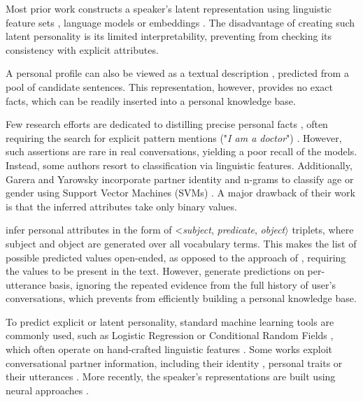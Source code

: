 Most prior work constructs a speaker's latent representation using linguistic feature sets \cite{AIIDElin11, jing-kambhatla-roukos:2007:ACLMain, garera-yarowsky:2009:ACLIJCNLP}, language models \cite{song2019learning} or embeddings \cite{luo2019learning, li2016persona}. The disadvantage of creating such latent personality is its limited interpretability, preventing from checking its consistency with explicit attributes.

A personal profile can also be viewed as a textual description \cite{zhang2018personalizing}, predicted from a pool of candidate sentences. This representation, however, provides no exact facts, which can be readily inserted into a personal knowledge base.

Few research efforts are dedicated to distilling precise personal facts \cite{dial7, welch2019look, garera-yarowsky:2009:ACLIJCNLP}, often requiring the search for explicit pattern mentions ("\textit{I am a doctor}") \cite{dial7}. However, such assertions are rare in real conversations, yielding a poor recall of the models. Instead, some authors resort to classification \cite{AIIDElin11, garera-yarowsky:2009:ACLIJCNLP} via linguistic features. Additionally, Garera and Yarowsky incorporate partner identity and n-grams to classify age or gender using Support Vector Machines (SVMs) \cite{garera-yarowsky:2009:ACLIJCNLP}. A major drawback of their work is that the inferred attributes take only binary values.

\citet{wu2019getting} infer personal attributes in the form of <\textit{subject}, \textit{predicate}, \textit{object}$\rangle$ triplets, where subject and object are generated over all vocabulary terms. This makes the list of possible predicted values open-ended, as opposed to the approach of \citet{dial7}, requiring the values to be present in the text. However, \citet{wu2019getting} generate predictions on per-utterance basis, ignoring the repeated evidence from the full history of user's conversations, which prevents from efficiently building a personal knowledge base.

To predict explicit or latent personality, standard machine learning tools are commonly used, such as Logistic Regression \cite{azab2019representing} or Conditional Random Fields \cite{li2016persona}, which often operate on hand-crafted linguistic features \cite{garera-yarowsky:2009:ACLIJCNLP}. Some works exploit conversational partner information, including their identity \cite{azab2019representing}, personal traits \cite{garera-yarowsky:2009:ACLIJCNLP} or their utterances \cite{welch2019look}. More recently, the speaker's representations are built using neural approaches \cite{zhang2018personalizing, pers2, luo2019learning, welch2019look}.

